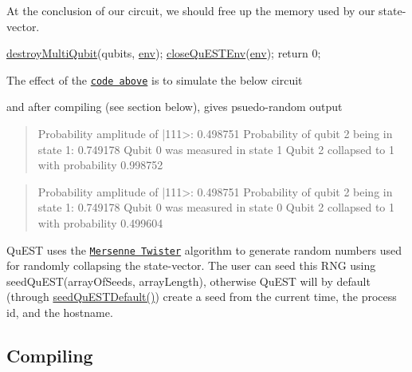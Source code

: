 At the conclusion of our circuit, we should free up the memory used by our state-\/vector. 
\begin{DoxyCode}
\mbox{\hyperlink{QuEST_8c_ae5d6acc322314d7a3d8a2eccf00d3b19}{destroyMultiQubit}}(qubits, \mbox{\hyperlink{runTests_8c_a5fd8ba97fcae3408ae6221dfc3cc1f93}{env}}); 
\mbox{\hyperlink{QuEST__env__local_8c_abd4bc926cd3f9b65610bb228d0c59fe0}{closeQuESTEnv}}(\mbox{\hyperlink{runTests_8c_a5fd8ba97fcae3408ae6221dfc3cc1f93}{env}});
\textcolor{keywordflow}{return} 0;
\end{DoxyCode}


The effect of the \href{tutorial_example.c}{\tt code above} is to simulate the below circuit



and after compiling (see section below), gives psuedo-\/random output

\begin{quote}

\begin{DoxyCode}
Probability amplitude of |111>: 0.498751
Probability of qubit 2 being in state 1: 0.749178
Qubit 0 was measured in state 1
Qubit 2 collapsed to 1 with probability 0.998752
\end{DoxyCode}
 \end{quote}


\begin{quote}

\begin{DoxyCode}
Probability amplitude of |111>: 0.498751
Probability of qubit 2 being in state 1: 0.749178
Qubit 0 was measured in state 0
Qubit 2 collapsed to 1 with probability 0.499604
\end{DoxyCode}
 \end{quote}


Qu\+E\+ST uses the \href{http://www.math.sci.hiroshima-u.ac.jp/~m-mat/MT/MT2002/emt19937ar.html}{\tt Mersenne Twister} algorithm to generate random numbers used for randomly collapsing the state-\/vector. The user can seed this R\+NG using {\ttfamily seed\+Qu\+E\+S\+T(array\+Of\+Seeds, array\+Length)}, otherwise Qu\+E\+ST will by default (through {\ttfamily \mbox{\hyperlink{QuEST_8c_ab0ab3ec70938712c26988a6aa51263a0}{seed\+Qu\+E\+S\+T\+Default()}}}) create a seed from the current time, the process id, and the hostname. 



\subsection*{Compiling}

